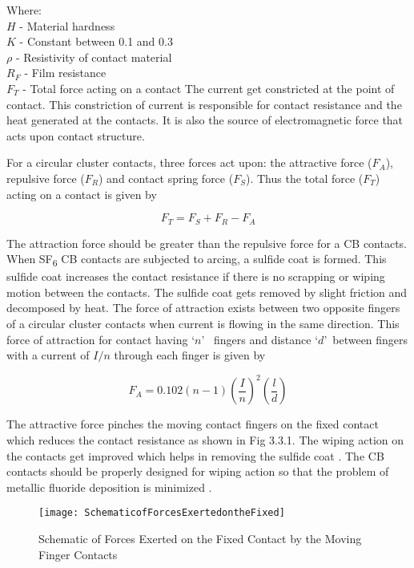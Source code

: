 Where:\\
$H$ - Material hardness\\
$K$ - Constant between 0.1 and 0.3\\
$\rho$  - Resistivity of contact material\\
$R_F$ - Film resistance\\
$F_T$ - Total force acting on a contact
The current get constricted at the point of contact. This constriction of current is responsible for contact resistance and the heat generated at the contacts. It is also the source of electromagnetic force that acts upon contact structure.

For a circular cluster contacts, three forces act upon: the attractive force ($F_A$), repulsive force ($F_R$) and contact spring force ($F_S$). Thus the total force ($F_T$) acting on a contact is given by 

\begin{equation}
F_T = F_S + F_R - F_A
\end{equation}

The attraction force should be greater than the repulsive force for a CB contacts. When SF\textsubscript{6} CB contacts are subjected to arcing, a sulfide coat is formed. This sulfide coat increases the contact resistance if there is no scrapping or wiping motion between the contacts. The sulfide coat gets removed by slight friction and decomposed by heat. The force of attraction exists between two opposite fingers of a circular cluster contacts when current is flowing in the same direction. This force of attraction for contact having \textquoteleft$n$\textquoteright ~ fingers and distance \textquoteleft$d$\textquoteright ~between fingers with a current of $I/n$ through each finger is given by 

\begin{equation}
F_A = 0.102 (n-1) \left( \frac{I}{n}\right)^2 \left( \frac{l}{d}\right)
\end{equation}

The attractive force pinches the moving contact fingers on the fixed contact which reduces the contact resistance as shown in Fig 3.3.1. The wiping action on the contacts get improved which helps in removing the sulfide coat \cite{hedman2009optimal}. The CB contacts should be properly designed for wiping action so that the problem of metallic fluoride deposition is minimized \cite{kezunovic2014reliable}.

\begin{figure}[!htbp]
    \centering
    \texttt{[image: SchematicofForcesExertedontheFixed]}
    \caption{Schematic of Forces Exerted on the Fixed Contact by the Moving Finger Contacts}
    \label{fig:Schematic of Forces Exerted on the Fixed Contact by the Moving Finger Contacts}
\end{figure}

